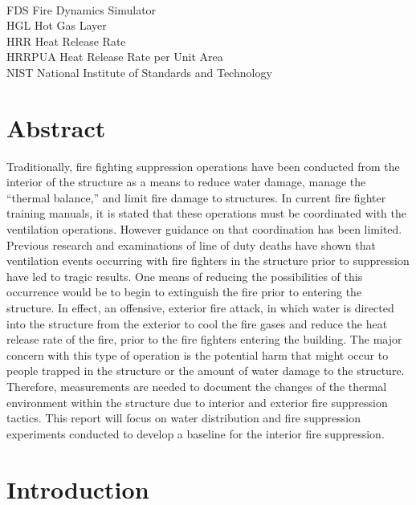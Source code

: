 \documentclass[12pt,oneside]{book}
\begin{document}
\begin{tabbing}
\hspace{1.5in} \= \\
FDS \> Fire Dynamics Simulator \\
HGL \> Hot Gas Layer \\
HRR \> Heat Release Rate \\
HRRPUA \> Heat Release Rate per Unit Area \\
NIST \> National Institute of Standards and Technology \\
\end{tabbing}
	
\mainmatter
	
\chapter{Abstract}
\label{chap:Abstract} 

Traditionally, fire fighting suppression operations have been conducted from the interior of the structure as a means to reduce water damage, manage the “thermal balance,” and limit fire damage to structures.  In current fire fighter training manuals, it is stated that these operations must be coordinated with the ventilation operations.  However guidance on that coordination has been limited.  Previous research and examinations of line of duty deaths have shown that ventilation events occurring with fire fighters in the structure prior to suppression have led to tragic results.  One means of reducing the possibilities of this occurrence would be to begin to extinguish the fire prior to entering the structure.  In effect, an offensive, exterior fire attack, in which water is directed into the structure from the exterior to cool the fire gases and reduce the heat release rate of the fire, prior to the fire fighters entering the building.  The major concern with this type of operation is the potential harm that might occur to people trapped in the structure or the amount of water damage to the structure.  Therefore, measurements are needed to document the changes of the thermal environment within the structure due to interior and exterior fire suppression tactics.  This report will focus on water distribution and fire suppression experiments conducted to develop a baseline for the interior fire suppression.

\chapter{Introduction}
\label{chap:Introduction}
\end{document}
